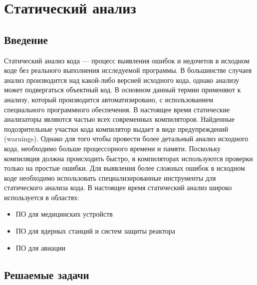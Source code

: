 \chapter{Статический анализ}

\section{Введение}

Статический анализ кода --- процесс выявления ошибок и недочетов в исходном коде без реального выполнения 
исследуемой программы. В большинстве случаев анализ производится над какой-либо версией исходного кода,
однако анализу может подвергаться объектный код. В основном данный термин применяют к анализу,
который производится автоматизировано, с использованием специального программного обеспечения.
В настоящее время статические анализаторы являются частью всех современных компиляторов. 
Найденные подозрительные участки кода компилятор выдает в виде предупреждений (warnings). 
Однако для того чтобы провести более детальный анализ исходного кода, необходимо больше процессорного времени и памяти. 
Поскольку компиляция должна происходить быстро, в компиляторах используются проверки только
на простые ошибки. Для выявления более сложных ошибок в исходном коде 
необходимо использовать специализированные инструменты для статического анализа кода.
В настоящее время статический анализ широко используется в областях:
\begin{itemize}
	\item ПО для медицинских устройств
	\item ПО для ядерных станций и систем защиты реактора
	\item ПО для авиации
\end{itemize}

\section{Решаемые задачи}

